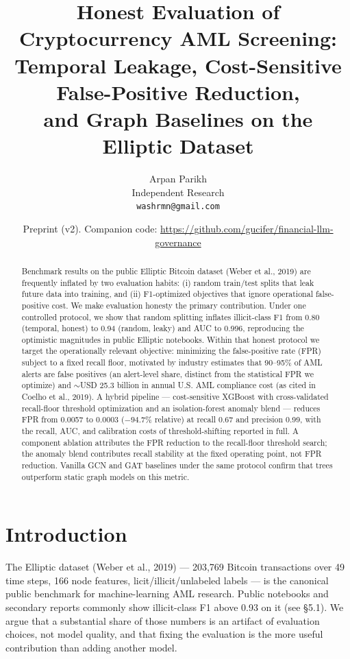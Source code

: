 \documentclass[11pt]{article}
\title{\bfseries Honest Evaluation of Cryptocurrency AML Screening:\\
Temporal Leakage, Cost-Sensitive False-Positive Reduction,\\
and Graph Baselines on the Elliptic Dataset}
\author{Arpan Parikh\\
\small Independent Research\\
\small \texttt{washrmn@gmail.com}}
\date{Preprint (v2). Companion code: \url{https://github.com/gucifer/financial-llm-governance}}
\begin{document}
\maketitle

\begin{abstract}
\noindent Benchmark results on the public Elliptic Bitcoin dataset (Weber et al., 2019) are frequently inflated by two evaluation habits: (i) random train/test splits that leak future data into training, and (ii) F1-optimized objectives that ignore operational false-positive cost. We make evaluation honesty the primary contribution. Under one controlled protocol, we show that random splitting inflates illicit-class F1 from 0.80 (temporal, honest) to 0.94 (random, leaky) and AUC to 0.996, reproducing the optimistic magnitudes in public Elliptic notebooks. Within that honest protocol we target the operationally relevant objective: minimizing the false-positive rate (FPR) subject to a fixed recall floor, motivated by industry estimates that 90--95\% of AML alerts are false positives (an alert-level share, distinct from the statistical FPR we optimize) and $\sim$USD 25.3 billion in annual U.S. AML compliance cost (as cited in Coelho et al., 2019). A hybrid pipeline --- cost-sensitive XGBoost with cross-validated recall-floor threshold optimization and an isolation-forest anomaly blend --- reduces FPR from 0.0057 to 0.0003 ($-94.7\%$ relative) at recall 0.67 and precision 0.99, with the recall, AUC, and calibration costs of threshold-shifting reported in full. A component ablation attributes the FPR reduction to the recall-floor threshold search; the anomaly blend contributes recall stability at the fixed operating point, not FPR reduction. Vanilla GCN and GAT baselines under the same protocol confirm that trees outperform static graph models on this metric.
\end{abstract}

\section{Introduction}

The Elliptic dataset (Weber et al., 2019) --- 203,769 Bitcoin transactions over 49 time steps, 166 node features, licit/illicit/unlabeled labels --- is the canonical public benchmark for machine-learning AML research. Public notebooks and secondary reports commonly show illicit-class F1 above 0.93 on it (see \S5.1). We argue that a substantial share of those numbers is an artifact of evaluation choices, not model quality, and that fixing the evaluation is the more useful contribution than adding another model.
\end{document}
